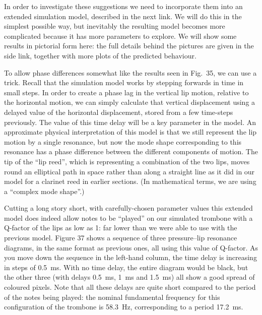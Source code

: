 
  In order to investigate these suggestions we need to incorporate them into an 
  extended simulation model, described in the next link. We will do this in the 
  simplest possible way, but inevitably the resulting model becomes more 
  complicated because it has more parameters to explore. We will show some 
  results in pictorial form here: the full details behind the pictures are 
  given in the side link, together with more plots of the predicted behaviour. 

  To allow phase differences somewhat like the results seen in Fig.\ 35, we can 
  use a trick. Recall that the simulation model works by stepping forwards in 
  time in small steps. In order to create a phase lag in the vertical lip 
  motion, relative to the horizontal motion, we can simply calculate that 
  vertical displacement using a delayed value of the horizontal displacement, 
  stored from a few time-steps previously. The value of this time delay will be 
  a key parameter in the model. An approximate physical interpretation of this 
  model is that we still represent the lip motion by a single resonance, but 
  now the mode shape corresponding to this resonance has a phase difference 
  between the different components of motion. The tip of the “lip reed”, which 
  is representing a combination of the two lips, moves round an elliptical path 
  in space rather than along a straight line as it did in our model for a 
  clarinet reed in earlier sections. (In mathematical terms, we are using a 
  “complex mode shape”.) 

  Cutting a long story short, with carefully-chosen parameter values this 
  extended model does indeed allow notes to be “played” on our simulated 
  trombone with a Q-factor of the lips as low as 1: far lower than we were able 
  to use with the previous model. Figure 37 shows a sequence of three 
  pressure--lip resonance diagrams, in the same format as previous ones, all 
  using this value of Q-factor. As you move down the sequence in the left-hand 
  column, the time delay is increasing in steps of 0.5~ms. With no time delay, 
  the entire diagram would be black, but the other three (with delays 0.5~ms, 
  1~ms and 1.5~ms) all show a good spread of coloured pixels. Note that all 
  these delays are quite short compared to the period of the notes being 
  played: the nominal fundamental frequency for this configuration of the 
  trombone is 58.3~Hz, corresponding to a period 17.2~ms. 

